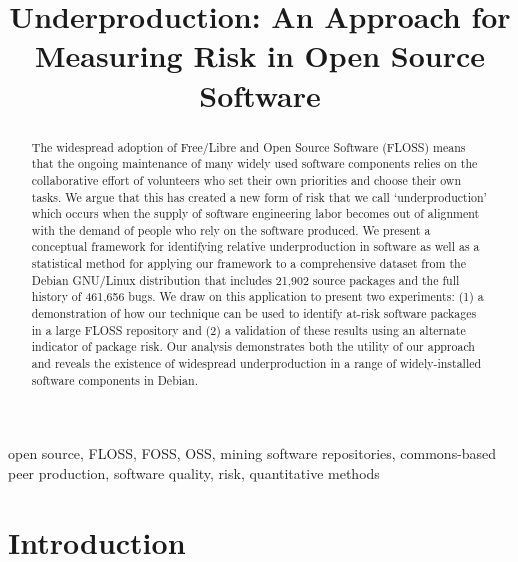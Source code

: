 \documentclass[10pt,conference]{IEEEtran}\usepackage[]{graphicx}\usepackage[usenames,dvipsnames]{color}
\begin{document}
\title{Underproduction: An Approach for Measuring Risk in Open Source Software}


\author{\and{}}

\maketitle
 
\thispagestyle{plain}
\pagestyle{plain}

\begin{abstract}
The widespread adoption of Free/Libre and Open Source Software (FLOSS) means that the ongoing maintenance of many widely used software components relies on the collaborative effort of volunteers who set their own priorities and choose their own tasks. We argue that this has created a new form of risk that we call `underproduction' which occurs when the supply of software engineering labor becomes out of alignment with the demand of people who rely on the software produced. We present a conceptual framework for identifying relative underproduction in software as well as a statistical method for applying our framework to a comprehensive dataset from the Debian GNU/Linux distribution that includes 21,902 source packages and the full history of 461,656 bugs. We draw on this application to present two experiments: (1) a demonstration of how our technique can be used to identify at-risk software packages in a large FLOSS repository and (2) a validation of these results using an alternate indicator of package risk. Our analysis demonstrates both the utility of our approach and reveals the existence of widespread underproduction in a range of widely-installed software components in Debian.
\end{abstract}

\begin{IEEEkeywords}
open source, FLOSS, FOSS, OSS, mining software repositories, commons-based peer production, software quality, risk, quantitative methods
\end{IEEEkeywords}

\section{Introduction}
\end{document}
